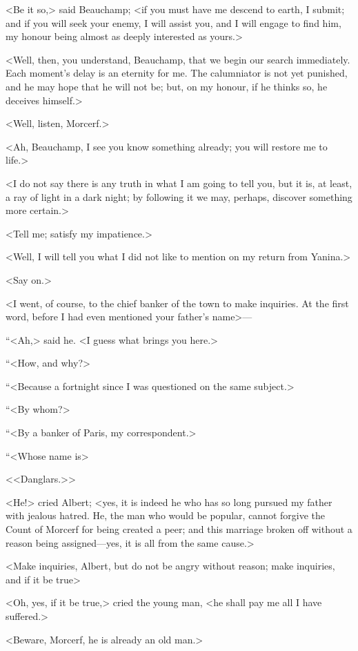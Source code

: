  <Be it so,> said Beauchamp; <if you must have me descend to earth, I submit; and if you will seek your enemy, I will assist you, and I will engage to find him, my honour being almost as deeply interested as yours.> 

 <Well, then, you understand, Beauchamp, that we begin our search immediately. Each moment's delay is an eternity for me. The calumniator is not yet punished, and he may hope that he will not be; but, on my honour, if he thinks so, he deceives himself.> 

 <Well, listen, Morcerf.> 

 <Ah, Beauchamp, I see you know something already; you will restore me to life.> 

 <I do not say there is any truth in what I am going to tell you, but it is, at least, a ray of light in a dark night; by following it we may, perhaps, discover something more certain.> 

 <Tell me; satisfy my impatience.> 

 <Well, I will tell you what I did not like to mention on my return from Yanina.> 

 <Say on.> 

 <I went, of course, to the chief banker of the town to make inquiries. At the first word, before I had even mentioned your father's name>— 

 “<Ah,> said he. <I guess what brings you here.> 

 “<How, and why?> 

 “<Because a fortnight since I was questioned on the same subject.> 

 “<By whom?> 

 “<By a banker of Paris, my correspondent.> 

 “<Whose name is\longdash> 

 <<Danglars.>> 

 <He!> cried Albert; <yes, it is indeed he who has so long pursued my father with jealous hatred. He, the man who would be popular, cannot forgive the Count of Morcerf for being created a peer; and this marriage broken off without a reason being assigned—yes, it is all from the same cause.> 

 <Make inquiries, Albert, but do not be angry without reason; make inquiries, and if it be true\longdash> 

 <Oh, yes, if it be true,> cried the young man, <he shall pay me all I have suffered.> 

 <Beware, Morcerf, he is already an old man.> 

